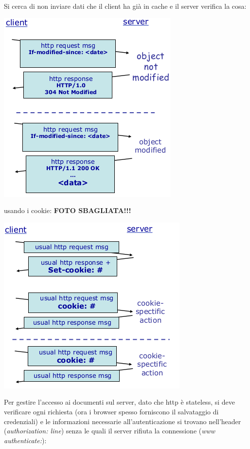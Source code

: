 \documentclass[a4paper,12pt, oneside]{book}
\begin{document}
Si cerca di non inviare dati che il client ha già in cache e il server verifica la cosa:
\begin{center}
\includegraphics[scale=0.7]{img/http4.png}
\end{center}
usando i cookie:
\textbf{FOTO SBAGLIATA!!!}
\begin{center}
\includegraphics[scale=0.7]{img/http5.png}
\end{center}
Per gestire l'accesso ai documenti sul server, dato che http è stateless, si deve verificare ogni richiesta (ora i browser spesso forniscono il salvataggio di credenziali) e le informazioni necessarie all'autenticazione si trovano nell'header (\textit{authorization: line}) senza le quali il server rifiuta la connessione (\textit{www authenticate:}): 
\end{document}
